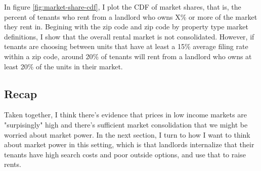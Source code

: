 \documentclass{article}
\begin{document}
In figure \ref{fig:market-share-cdf}, I plot the CDF of market shares, that is, the percent of tenants who rent from a landlord who owns X\% or more of the market they rent in. Begining with the zip code and zip code by property type market definitions, I show that the overall rental market is not consolidated. However, if tenants are choosing between units that have at least a 15\% average filing rate within a zip code, around 20\% of tenants will rent from a landlord who owns at least 20\% of the units in their market. 

\subsection{Recap}
Taken together, I think there's evidence that prices in low income markets are "surpisingly" high and there's sufficient market consolidation that we might be worried about market power. In the next section, I turn to how I want to think about market power in this setting, which is that landlords internalize that their tenants have high search costs and poor outside options, and use that to raise rents.
\clearpage




\end{document}
